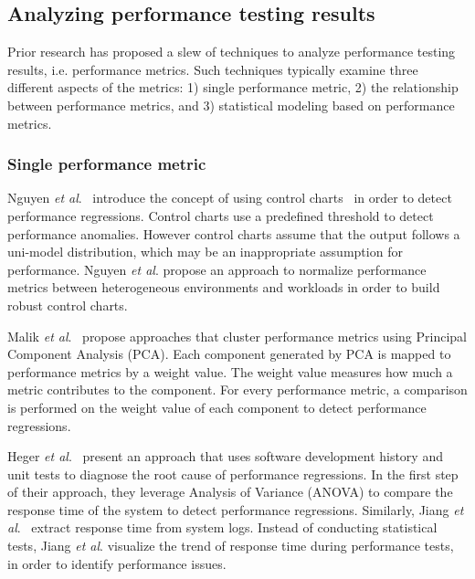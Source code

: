 \subsection{Analyzing performance testing results} 
\label{sec:related_types_of_analysis}

Prior research has proposed a slew of techniques to analyze performance testing results, i.e. performance metrics. Such techniques typically examine three different aspects of the metrics: 1) single performance metric, 2) the relationship between performance metrics, and 3) statistical modeling based on performance metrics.


\subsubsection{Single performance metric}
\label{sec:relatedindividual}
Nguyen \textit{et al$.$}~\cite{Nguyen:2012:ADP:2188286.2188344} introduce the concept of using control charts~\cite{shewhart1931economic} in order to detect performance regressions. Control charts use a predefined threshold to detect performance anomalies. However control charts assume that the output follows a uni-model distribution, which may be an inappropriate assumption for performance. Nguyen \textit{ et al$.$} propose an approach to normalize performance metrics between heterogeneous environments and workloads in order to build robust control charts. %

Malik \emph{et al$.$}~\cite{Malik:2010:ACL:1955601.1955936, haroon} propose approaches that cluster performance metrics using Principal Component Analysis (PCA). Each component generated by PCA is mapped to performance metrics by a weight value. The weight value measures how much a metric contributes to the component. For every performance metric, a comparison is performed on the weight value of each component to detect performance regressions.

Heger \emph{et al$.$}~\cite{DBLP:conf/wosp/HegerHF13} present an approach that uses software development history and unit tests to diagnose the root cause of performance regressions. In the first step of their approach, they leverage Analysis of Variance (ANOVA) to compare the response time of the system to detect performance regressions. Similarly, Jiang \emph{et al$.$}~\cite{jackicsm2009} extract response time from system logs. Instead of conducting statistical tests, Jiang \emph{et al$.$} visualize the trend of response time during performance tests, in order to identify performance issues.


